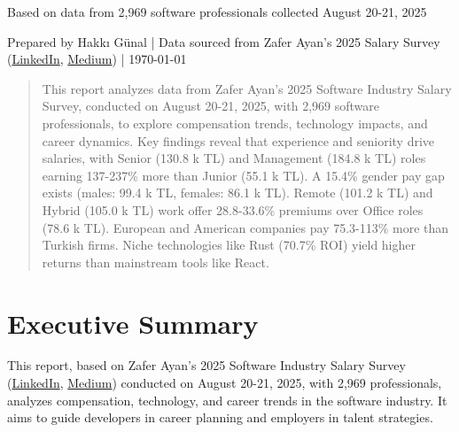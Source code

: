 \documentclass[12pt,a4paper]{article}
\begin{document}
\begin{titlepage}
{\begin{minipage}{0.8\textwidth}
        \end{minipage}
    \par}
    \vspace{1cm}
    {\normalsize \color{darkgray} Based on data from 2,969 software professionals collected August 20-21, 2025\par}
    \vspace{0.5cm}
    {\small \color{darkgray} Prepared by Hakkı Günal | Data sourced from Zafer Ayan's 2025 Salary Survey (\href{https://www.linkedin.com/posts/zaferayan_geleneksel-maa%C5%9F-anketi-buyrun-httpslnkdin-activity-7363866008664629248-7YcQ}{LinkedIn}, \href{https://zaferayan.medium.com/2025-a%C4%9Fustos-detayl%C4%B1-maa%C5%9F-anketi-98446d71920a}{Medium}) | \today}
    \vfill
\end{titlepage}

\pagestyle{fancy}

\tableofcontents
\newpage

\begin{abstract}
This report analyzes data from Zafer Ayan's 2025 Software Industry Salary Survey, conducted on August 20-21, 2025, with 2,969 software professionals, to explore compensation trends, technology impacts, and career dynamics. Key findings reveal that experience and seniority drive salaries, with Senior (130.8 k TL) and Management (184.8 k TL) roles earning 137-237\% more than Junior (55.1 k TL). A 15.4\% gender pay gap exists (males: 99.4 k TL, females: 86.1 k TL). Remote (101.2 k TL) and Hybrid (105.0 k TL) work offer 28.8-33.6\% premiums over Office roles (78.6 k TL). European and American companies pay 75.3-113\% more than Turkish firms. Niche technologies like Rust (70.7\% ROI) yield higher returns than mainstream tools like React. 
\end{abstract}

\section{Executive Summary}

This report, based on Zafer Ayan's 2025 Software Industry Salary Survey (\href{https://www.linkedin.com/posts/zaferayan_geleneksel-maa%C5%9F-anketi-buyrun-httpslnkdin-activity-7363866008664629248-7YcQ}{LinkedIn}, \href{https://zaferayan.medium.com/2025-a%C4%9Fustos-detayl%C4%B1-maa%C5%9F-anketi-98446d71920a}{Medium}) conducted on August 20-21, 2025, with 2,969 professionals, analyzes compensation, technology, and career trends in the software industry. It aims to guide developers in career planning and employers in talent strategies.
\end{document}
